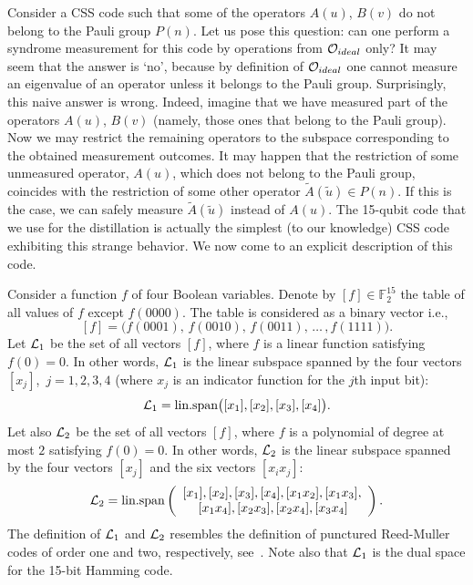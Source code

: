 \documentclass[pra,twocolumn,showpacs]{revtex4}
\newcommand{\FF}{\mathbb{F}}
\newcommand{\calL}{{\cal L }}
\newcommand{\calO}{{\cal O }}
\newcommand{\ba}{\begin{array}}
\newcommand{\ea}{\end{array}}
\begin{document}
Consider a CSS code such that some of the operators $A(u)$, $B(v)$ do not
belong to the Pauli group $P(n)$.  Let us pose this question: can one perform
a syndrome measurement for this code by operations from $\calO_{ideal}$ only?
It may seem that the answer is `no', because by definition of $\calO_{ideal}$
one cannot measure an eigenvalue of an operator unless it belongs to the Pauli
group. Surprisingly, this naive answer is wrong.  Indeed, imagine that we have
measured part of the operators $A(u)$, $B(v)$ (namely, those ones that belong
to the Pauli group). Now we may restrict the remaining operators to the
subspace corresponding to the obtained measurement outcomes. It may happen
that the restriction of some unmeasured operator, $A(u)$, which does not
belong to the Pauli group, coincides with the restriction of some other
operator $\tilde{A}(\tilde{u})\in P(n)$.  If this is the case, we can safely
measure $\tilde{A}(\tilde{u})$ instead of $A(u)$. The 15-qubit code that we
use for the distillation is actually the simplest (to our knowledge) CSS code
exhibiting this strange behavior. We now come to an explicit description of
this code.

Consider a function $f$ of four Boolean variables. Denote by $[f]\in
\FF_2^{15}$ the table of all values of $f$ except $f(0000)$. The table is
considered as a binary vector i.e.,
\[
[f]=\bigl( f(0001),\, f(0010),\, f(0011), \,\ldots\, ,f(1111)\bigr).
\]
Let $\calL_1$ be the set of all vectors $[f]$, where $f$ is a linear function
satisfying $f(0)=0$. In other words, $\calL_1$ is the linear subspace spanned
by the four vectors $[x_j]$,\, $j=1,2,3,4$ (where $x_{j}$ is an
indicator function for the $j$th input bit):
\[
\calL_1=\text{lin.span}\bigl([x_1], [x_2], [x_3], [x_4]\bigr).
\]
Let also $\calL_2$ be the set of all vectors $[f]$, where $f$ is a polynomial
of degree at most $2$ satisfying $f(0)=0$.  In other words, $\calL_2$ is the
linear subspace spanned by the four vectors $[x_j]$ and the six vectors $[x_i
x_j]$:
\begin{equation}
\calL_2 = \text{lin.span} \left(
\ba{c}
[x_1], [x_2], [x_3], [x_4], [x_1 x_2], [x_1 x_3], \\
\, [x_1 x_4], [x_2 x_3], [x_2 x_4], [x_3 x_4]
\ea
\right).
\end{equation}
The definition of $\calL_1$ and $\calL_2$ resembles the definition of
punctured Reed-Muller codes of order one and two, respectively,
see~\cite{MacWilliams}. Note also that $\calL_1$ is the dual space for the
15-bit Hamming code.
\end{document}
